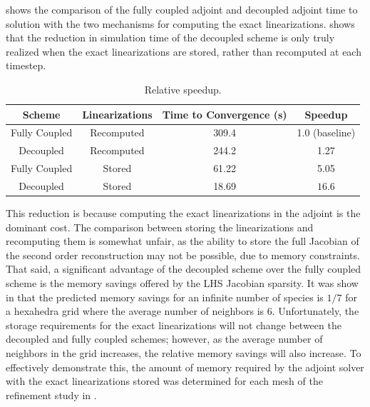  shows the comparison of the fully coupled adjoint and 
decoupled adjoint time to solution with the two mechanisms for computing the
exact linearizations.   shows that the reduction in
simulation time of the decoupled scheme is only truly realized when the exact
linearizations are stored, rather than recomputed at each timestep. 
\begin{table}[h]
  \centering
  \begin{tabular}{c|c|c|c}
    Scheme & Linearizations & Time to Convergence (s) & Speedup \\
    \hline
    Fully Coupled & Recomputed  & 309.4 & 1.0 (baseline)\\
    Decoupled     & Recomputed  & 244.2 & 1.27 \\
    Fully Coupled & Stored      & 61.22 & 5.05 \\
    Decoupled     & Stored      & 18.69 & $\mathbf{16.6}$ \\
  \end{tabular}
  \caption{Relative speedup.}
  \label{tab:srp-rel-speedup}
\end{table}
This reduction is because computing the exact linearizations in the adjoint is
the dominant cost.  The comparison between storing the linearizations and
recomputing them is somewhat unfair, as the ability to store the full Jacobian
of the second order reconstruction may not be possible, due to memory
constraints.  That said, a significant advantage of the decoupled scheme over
the fully coupled scheme is the memory savings offered by the LHS Jacobian
sparsity. It was show in  that the
predicted memory savings for an infinite number of species is $1/7$ for a
hexahedra grid where the average number of neighbors is 6.  Unfortunately, the
storage requirements for the exact linearizations will not change between the
decoupled and fully coupled schemes; however, as the average number of neighbors
in the grid increases, the relative memory savings will also increase.  To
effectively demonstrate this, the amount of memory required by the adjoint
solver with the exact linearizations stored was determined for each mesh of the
refinement study in .
